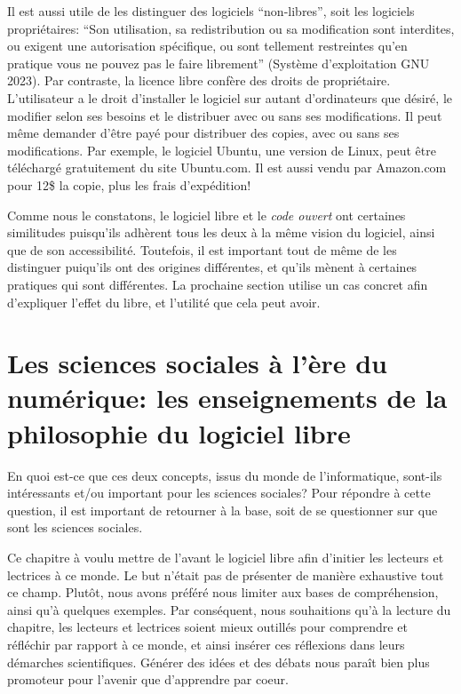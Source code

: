 \documentclass[
  letterpaper,
]{scrbook}
\begin{document}
Il est aussi utile de les distinguer des logiciels ``non-libres'', soit
les logiciels propriétaires: ``Son utilisation, sa redistribution ou sa
modification sont interdites, ou exigent une autorisation spécifique, ou
sont tellement restreintes qu'en pratique vous ne pouvez pas le faire
librement'' (Système d'exploitation GNU 2023). Par contraste, la licence
libre confère des droits de propriétaire. L'utilisateur a le droit
d'installer le logiciel sur autant d'ordinateurs que désiré, le modifier
selon ses besoins et le distribuer avec ou sans ses modifications. Il
peut même demander d'être payé pour distribuer des copies, avec ou sans
ses modifications. Par exemple, le logiciel Ubuntu, une version de
Linux, peut être téléchargé gratuitement du site Ubuntu.com. Il est
aussi vendu par Amazon.com pour 12\$ la copie, plus les frais
d'expédition!

Comme nous le constatons, le logiciel libre et le \emph{code ouvert} ont
certaines similitudes puisqu'ils adhèrent tous les deux à la même vision
du logiciel, ainsi que de son accessibilité. Toutefois, il est important
tout de même de les distinguer puiqu'ils ont des origines différentes,
et qu'ils mènent à certaines pratiques qui sont différentes. La
prochaine section utilise un cas concret afin d'expliquer l'effet du
libre, et l'utilité que cela peut avoir.

\hypertarget{les-sciences-sociales-uxe0-luxe8re-du-numuxe9rique-les-enseignements-de-la-philosophie-du-logiciel-libre}{%
\section{Les sciences sociales à l'ère du numérique: les enseignements
de la philosophie du logiciel
libre}\label{les-sciences-sociales-uxe0-luxe8re-du-numuxe9rique-les-enseignements-de-la-philosophie-du-logiciel-libre}}

En quoi est-ce que ces deux concepts, issus du monde de l'informatique,
sont-ils intéressants et/ou important pour les sciences sociales? Pour
répondre à cette question, il est important de retourner à la base, soit
de se questionner sur que sont les sciences sociales.

Ce chapitre à voulu mettre de l'avant le logiciel libre afin d'initier
les lecteurs et lectrices à ce monde. Le but n'était pas de présenter de
manière exhaustive tout ce champ. Plutôt, nous avons préféré nous
limiter aux bases de compréhension, ainsi qu'à quelques exemples. Par
conséquent, nous souhaitions qu'à la lecture du chapitre, les lecteurs
et lectrices soient mieux outillés pour comprendre et réfléchir par
rapport à ce monde, et ainsi insérer ces réflexions dans leurs démarches
scientifiques. Générer des idées et des débats nous paraît bien plus
promoteur pour l'avenir que d'apprendre par coeur.
\end{document}
